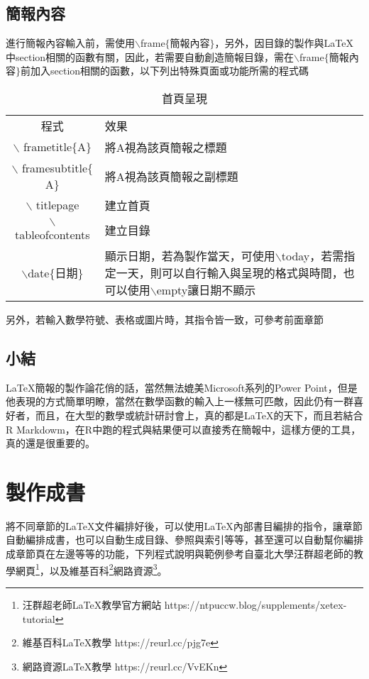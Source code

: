 \section{簡報內容}
進行簡報內容輸入前，需使用$\backslash$frame$\{$簡報內容$\}$，另外，因目錄的製作與\LaTeX 中{\A section}相關的函數有關，因此，若需要自動創造簡報目錄，需在$\backslash$frame$\{$簡報內容$\}$前加入{\A section}相關的函數，以下列出特殊頁面或功能所需的程式碼
\begin{table}[H]\caption{首頁呈現}\label{wide}
    \centering
\begin{tabular}{cp{8cm}}
\extrarowheight=10pt
\\\hline
程式 & 效果\\
\hline
  $\backslash$ frametitle$\{$A$\}$  & 將A視為該頁簡報之標題
\\\hline  
  $\backslash$ framesubtitle$\{$A$\}$ & 將A視為該頁簡報之副標題
\\\hline

  $\backslash$ titlepage & 建立首頁
\\\hline
  $\backslash$ tableofcontents  & 建立目錄
\\\hline
  $\backslash$date$\{$日期$\}$ & 顯示日期，若為製作當天，可使用$\backslash$today，若需指定一天，則可以自行輸入與呈現的格式與時間，也可以使用$\backslash$empty讓日期不顯示  \\\hline
      \end{tabular}
    \end{table}
另外，若輸入數學符號、表格或圖片時，其指令皆一致，可參考前面章節
\section*{小結}
\LaTeX 簡報的製作論花俏的話，當然無法媲美Microsoft系列的Power Point，但是他表現的方式簡單明瞭，當然在數學函數的輸入上一樣無可匹敵，因此仍有一群喜好者，而且，在大型的數學或統計研討會上，真的都是\LaTeX 的天下，而且若結合R Markdowm，在R中跑的程式與結果便可以直接秀在簡報中，這樣方便的工具，真的還是很重要的。

\chapter{製作成書}
 將不同章節的\LaTeX 文件編排好後，可以使用\LaTeX 內部書目編排的指令，讓章節自動編排成書，也可以自動生成目錄、參照與索引等等，甚至還可以自動幫你編排成章節頁在左邊等等的功能，下列程式說明與範例參考自臺北大學汪群超老師的教學網頁\footnote{汪群超老師\LaTeX 教學官方網站 https://ntpuccw.blog/supplements/xetex-tutorial}，以及維基百科\footnote{維基百科\LaTeX 教學 https://reurl.cc/pjg7e}網路資源\footnote{網路資源\LaTeX 教學 https://reurl.cc/VvEKn}。
